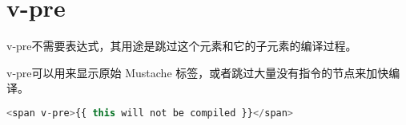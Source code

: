 \begin{lstlisting}[language=JavaScript]

\end{lstlisting}



\begin{lstlisting}[language=JavaScript]

\end{lstlisting}




\begin{lstlisting}[language=JavaScript]

\end{lstlisting}




\begin{lstlisting}[language=JavaScript]

\end{lstlisting}




\begin{lstlisting}[language=JavaScript]

\end{lstlisting}




\begin{lstlisting}[language=JavaScript]

\end{lstlisting}




\begin{lstlisting}[language=JavaScript]

\end{lstlisting}




\begin{lstlisting}[language=JavaScript]

\end{lstlisting}

\chapter{v-pre}



v-pre不需要表达式，其用途是跳过这个元素和它的子元素的编译过程。

v-pre可以用来显示原始 Mustache 标签，或者跳过大量没有指令的节点来加快编译。


\begin{lstlisting}[language=JavaScript]
<span v-pre>{{ this will not be compiled }}</span>
\end{lstlisting}



